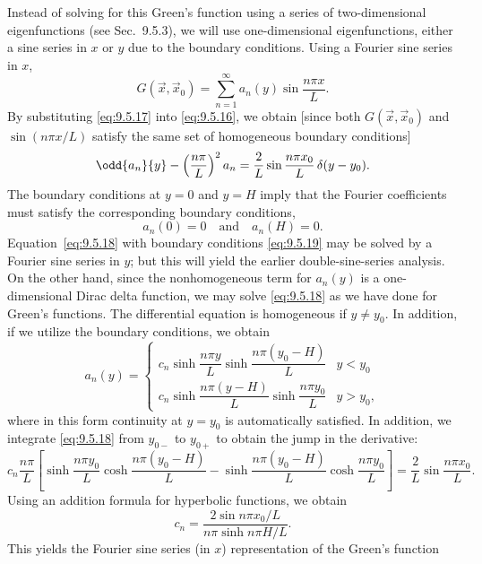 Instead of solving for this Green's function using a series of two-dimensional eigenfunctions (see Sec.~9.5.3), we will use one-dimensional eigenfunctions, either a sine series in $x$ or $y$ due to the boundary conditions.  Using a Fourier sine series in $x$,
\begin{equation}
\label{eq:9.5.17}
G(\vec{x},\vec{x}_0) = \sum_{n=1}^{\infty} a_n(y)\sin\frac{n\pi x}{L}.
\end{equation}
By substituting \eqref{eq:9.5.17} into \eqref{eq:9.5.16}, we obtain [since both $G(\vec{x},\vec{x}_0)$ and $\sin(n\pi x/L)$ satisfy the same set of homogeneous boundary conditions]
\begin{equation}
\label{eq:9.5.18}
\odd{a_n}{y} - \left(\frac{n\pi}{L}\right)^2 a_n = \frac{2}{L}\sin\frac{n\pi x_0}{L}\,\delta(y-y_0).
\end{equation}
The boundary conditions at $y=0$ and $y=H$ imply that the Fourier coefficients must satisfy the corresponding boundary conditions,
\begin{equation}
\label{eq:9.5.19}
a_n(0) = 0 \quad\text{and}\quad a_n(H) = 0.
\end{equation}
Equation~\eqref{eq:9.5.18} with boundary conditions \eqref{eq:9.5.19} may be solved by a Fourier sine series in $y$; but this will yield the earlier double-sine-series analysis.  On the other hand, since the nonhomogeneous term for $a_n(y)$ is a one-dimensional Dirac delta function, we may solve \eqref{eq:9.5.18} as we have done for Green's functions.  The differential equation is homogeneous if $y \neq y_0$.  In addition, if we utilize the boundary conditions, we obtain
\[
a_n(y) = \begin{cases}
c_n\sinh\dfrac{n\pi y}{L}\sinh\dfrac{n\pi(y_0-H)}{L} & y < y_0 \\[8pt]
c_n\sinh\dfrac{n\pi(y-H)}{L}\sinh\dfrac{n\pi y_0}{L} & y > y_0,
\end{cases}
\]
where in this form continuity at $y = y_0$ is automatically satisfied.  In addition, we integrate \eqref{eq:9.5.18} from $y_{0-}$ to $y_{0+}$ to obtain the jump in the derivative:
\begin{equation}
\label{eq:9.5.20}
c_n\frac{n\pi}{L}\left[\sinh\frac{n\pi y_0}{L}\cosh\frac{n\pi(y_0-H)}{L} - \sinh\frac{n\pi(y_0-H)}{L}\cosh\frac{n\pi y_0}{L}\right] = \frac{2}{L}\sin\frac{n\pi x_0}{L}.
\end{equation}
Using an addition formula for hyperbolic functions, we obtain
\[
c_n = \frac{2\sin n\pi x_0/L}{n\pi\sinh n\pi H/L}.
\]
This yields the Fourier sine series (in $x$) representation of the Green's function
